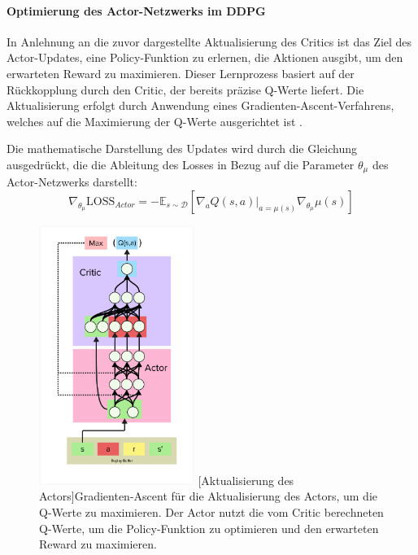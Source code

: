 \paragraph{Optimierung des Actor-Netzwerks im DDPG}

In Anlehnung an die zuvor dargestellte Aktualisierung des Critics ist das Ziel des Actor-Updates, eine Policy-Funktion zu erlernen, die Aktionen ausgibt, um den erwarteten Reward zu maximieren. Dieser Lernprozess basiert auf der Rückkopplung durch den Critic, der bereits präzise Q-Werte liefert. Die Aktualisierung erfolgt durch Anwendung eines Gradienten-Ascent-Verfahrens, welches auf die Maximierung der Q-Werte ausgerichtet ist \cite{Lillicrap2016DDPG, Wu2018AggregatedMultiDDPG}.


Die mathematische Darstellung des Updates wird durch die Gleichung ausgedrückt, die die Ableitung des Losses in Bezug auf die Parameter \(\theta_\mu\) des Actor-Netzwerks darstellt:
\begin{equation}
\nabla_{\theta_\mu} \text{LOSS}_{Actor} = -\mathbb{E}_{s \sim \mathcal{D}} \left[ \nabla_a Q(s, a)|_{a=\mu(s)} \nabla_{\theta_\mu} \mu(s) \right]
		\label{eq:actor update}
\end{equation}


\begin{figure}[htbp]
\centering
\includegraphics[width=0.45\textwidth, trim=10px 10px 10px 10px, clip]{2Grundlagen/35_update_actor.png}
[Aktualisierung des Actors]{Gradienten-Ascent für die Aktualisierung des Actors, um die Q-Werte zu maximieren. Der Actor nutzt die vom Critic berechneten Q-Werte, um die Policy-Funktion zu optimieren und den erwarteten Reward zu maximieren.}
\label{fig:update_actor}
\end{figure}

